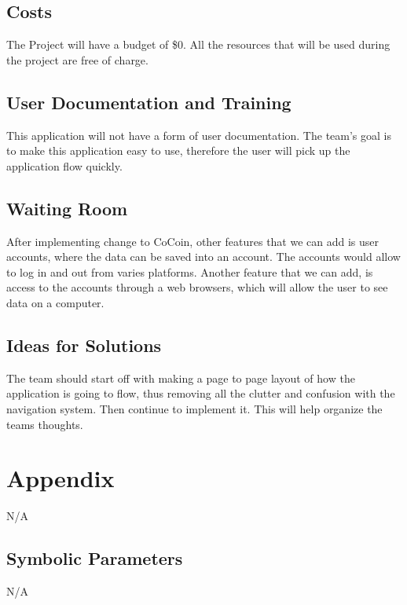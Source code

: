 \documentclass[12pt, titlepage]{article}
\begin{document}
\subsection{Costs}
The Project will have a budget of \$0. All the resources that will be used during the project are free of charge. 
\subsection{User Documentation and Training}
This application will not have a form of user documentation. The team’s goal is to make this application easy to use, therefore the user will pick up the application flow quickly. 
\subsection{Waiting Room}
After implementing change to CoCoin, other features that we can add is user accounts, where the data can be saved into an account. The accounts would allow to log in and out from varies platforms. Another feature that we can add, is access to the accounts through a web browsers, which will allow the user to see data on a computer. 
\subsection{Ideas for Solutions}
The team should start off with making a page to page layout of how the application is going to flow, thus removing all the clutter and confusion with the navigation system. Then continue to implement it. This will help organize the teams thoughts.




\newpage

\section{Appendix}
N/A

\subsection{Symbolic Parameters}
N/A
\end{document}
